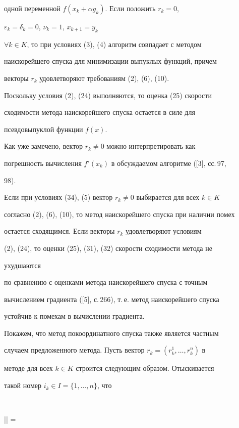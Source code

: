 одной переменной $f(x_k+\alpha g_k)$. Если положить $r_k=0$,


$\varepsilon_k=\delta_k=0$, $\nu_k=1$, $x_{k+1}=y_k$


$\forall k\in K$, то при условиях (3), (4) алгоритм совпадает с методом 


наискорейшего спуска для минимизации выпуклых функций, причем


векторы $r_k$ удовлетворяют требованиям (2), (6), (10).


Поскольку условия (2), (24) выполняются, то оценка (25) скорости 


сходимости метода наискорейшего спуска остается в силе для 


псевдовыпуклой функции $f(x)$.





Как уже замечено, вектор $r_k\neq 0$ можно интерпретировать как 


погрешность вычисления $f'(x_k)$ в обсуждаемом алгоритме ([3], сс.\,97, 


98).


Если при условиях (34), (5) вектор $r_k\neq 0$ выбирается для всех $k\in K$ 


согласно (2), (6), (10), то метод наискорейшего спуска при наличии помех


остается сходящимся. Если векторы $r_k$ удовлетворяют условиям 


(2), (24), то оценки (25), (31), (32) скорости сходимости метода не 


ухудшаются


по сравнению с оценками метода наискорейшего спуска с точным 


вычислением градиента ([5], с.\,266), т.\,е.{} метод наискорейшего спуска 


устойчив к помехам в вычислении градиента.





Покажем, что метод покоординатного спуска также является частным 


случаем предложенного метода. Пусть вектор $r_k=(r^1_k,\dotsc,r^n_k)$ в 


методе для всех $k\in K$ строится следующим образом. Отыскивается


такой номер $i_k\in I=\{1,\dotsc,n\}$, что 


$$


\bigg|\bigg| =


